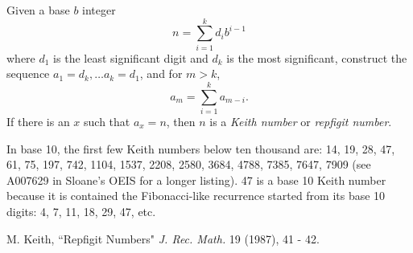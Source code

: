 \documentclass[12pt]{article}
\begin{document}
Given a base $b$ integer $$n = \sum_{i = 1}^k d_ib^{i - 1}$$ where $d_1$ is the least significant digit and $d_k$ is the most significant, construct the sequence $a_1 = d_k, \ldots a_k = d_1$, and for $m > k$, $$a_m = \sum_{i = 1}^k a_{m - i}.$$ If there is an $x$ such that $a_x = n$, then $n$ is a {\em Keith number} or {\em repfigit number}.

In base 10, the first few Keith numbers below ten thousand are: 14, 19, 28, 47, 61, 75, 197, 742, 1104, 1537, 2208, 2580, 3684, 4788, 7385, 7647, 7909 (see A007629 in Sloane's OEIS for a longer listing). 47 is a base 10 Keith number because it is contained the Fibonacci-like recurrence started from its base 10 digits: 4, 7, 11, 18, 29, 47, etc.

\begin{thebibliography}{1}
 M. Keith, ``Repfigit Numbers" {\it J. Rec. Math.} 19 (1987), 41 - 42.
\end{thebibliography}
\end{document}
